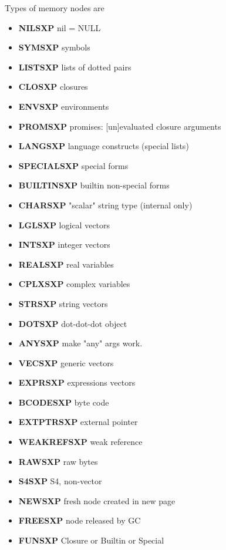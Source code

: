\documentclass[thesis=M,english]{FITthesis}[2018/10/20]
\begin{document}
Types of memory nodes are

\begin{itemize}
	\item \textbf{NILSXP} nil = NULL
	\item \textbf{SYMSXP}	     symbols
	\item \textbf{LISTSXP}	     lists of dotted pairs
	\item \textbf{CLOSXP}	     closures
	\item \textbf{ENVSXP}	     environments
	\item \textbf{PROMSXP}	     promises: [un]evaluated closure arguments
	\item \textbf{LANGSXP}	     language constructs (special lists)
	\item \textbf{SPECIALSXP}   	special forms
	\item \textbf{BUILTINSXP}   	builtin non-special forms
	\item \textbf{CHARSXP}	     "scalar" string type (internal only)
	\item \textbf{LGLSXP}	    logical vectors
	\item \textbf{INTSXP}	    integer vectors
	\item \textbf{REALSXP}	    real variables
	\item \textbf{CPLXSXP}	    complex variables
	\item \textbf{STRSXP}	    string vectors
	\item \textbf{DOTSXP}	    dot-dot-dot object
	\item \textbf{ANYSXP}	    make "any" args work.
	\item \textbf{VECSXP}	    generic vectors
	\item \textbf{EXPRSXP}	    expressions vectors
	\item \textbf{BCODESXP}    byte code
	\item \textbf{EXTPTRSXP}   external pointer
	\item \textbf{WEAKREFSXP}  weak reference
	\item \textbf{RAWSXP}      raw bytes
	\item \textbf{S4SXP}       S4, non-vector
	\item \textbf{NEWSXP}      fresh node created in new page
	\item \textbf{FREESXP}     node released by GC

	\item \textbf{FUNSXP}      Closure or Builtin or Special
\end{itemize}
\end{document}
